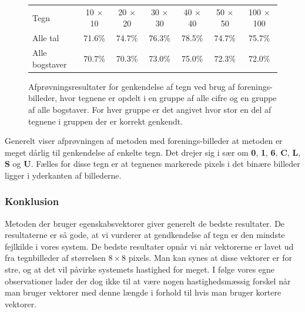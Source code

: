 \begin{figure}[htp]
\centering
\begin{tabular}{|l|c|c|c|c|c|c|}\hline
\rowcolor[gray]{0.9} \multicolumn{7}{|>{\columncolor[gray]{0.9}}c|}{\textbf{Genkendelse af tegn - Forenings-billeder}} \\ \hline
Tegn & 10 $\times$ 10 & 20 $\times$ 20 & 30 $\times$ 30 & 40 $\times$ 40 & 50 $\times$ 50 & 100 $\times$ 100\\\hline
Alle tal & 71.6\% & 74.7\% & 76.3\% & 78.5\% & 74.7\% & 75.7\%\\\hline
Alle bogstaver & 70.7\% & 70.3\% & 73.0\% & 75.0\% & 72.3\% & 72.0\%\\\hline
\end{tabular}
\caption{Afprøvningsresultater for genkendelse af tegn ved brug af forenings-billeder, hvor tegnene er opdelt i en gruppe af alle cifre og en gruppe af alle bogstaver. For hver gruppe er det angivet hvor stor en del af tegnene i gruppen der er korrekt genkendt.}
\label{fig:test:and_alletegn}
\end{figure}

Generelt viser afprøvningen af metoden med forenings-billeder at metoden er meget dårlig til genkendelse af enkelte tegn. Det drejer sig i sær om \textbf{0}, \textbf{1}, \textbf{6}, \textbf{C}, \textbf{L}, \textbf{S} og \textbf{U}. Fælles for disse tegn er at tegnenes markerede pixels i det binære billeder ligger i yderkanten af billederne.


\subsubsection{Konklusion}

Metoden der bruger egenskabsvektorer giver generelt de bedste resultater. De resultaterne er så gode, at vi vurderer at gendkendelse af tegn er den mindste fejlkilde i vores system. De bedste resultater opnår vi når vektorerne er lavet ud fra tegnbilleder af størrelsen $8 \times 8$ pixels. Man kan synes at disse vektorer er for stre, og at det vil påvirke systemets hastighed for meget. I følge vores egne observationer lader der dog ikke til at være nogen hastighedsmæssig forskel når man bruger vektorer med denne længde i forhold til hvis man bruger kortere vektorer.

